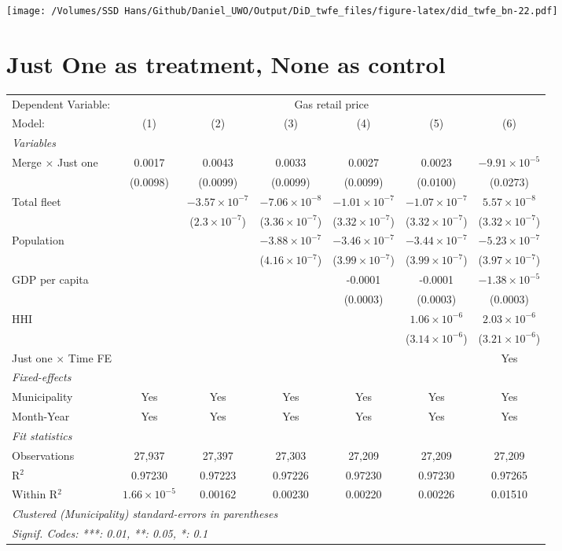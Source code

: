 \documentclass[
]{article}
\begin{document}
\texttt{[image: /Volumes/SSD Hans/Github/Daniel\_UWO/Output/DiD\_twfe\_files/figure-latex/did\_twfe\_bn-22.pdf]}

\hypertarget{just-one-as-treatment-none-as-control}{%
\section{Just One as treatment, None as
control}\label{just-one-as-treatment-none-as-control}}

\begin{tabular}{lcccccc}
\tabularnewline\midrule\midrule
Dependent Variable:&\multicolumn{6}{c}{Gas retail price}\\
Model:&(1) & (2) & (3) & (4) & (5) & (6)\\
\midrule \emph{Variables}&   &   &   &   &   &  \\
Merge $\times $ Just one & 0.0017 & 0.0043 & 0.0033 & 0.0027 & 0.0023 & $-9.91\times 10^{-5}$\\
  &(0.0098) & (0.0099) & (0.0099) & (0.0099) & (0.0100) & (0.0273)\\
Total fleet &    & $-3.57\times 10^{-7}$ & $-7.06\times 10^{-8}$ & $-1.01\times 10^{-7}$ & $-1.07\times 10^{-7}$ & $5.57\times 10^{-8}$\\
  &   & ($2.3\times 10^{-7}$) & ($3.36\times 10^{-7}$) & ($3.32\times 10^{-7}$) & ($3.32\times 10^{-7}$) & ($3.32\times 10^{-7}$)\\
Population &    &    & $-3.88\times 10^{-7}$ & $-3.46\times 10^{-7}$ & $-3.44\times 10^{-7}$ & $-5.23\times 10^{-7}$\\
  &   &    & ($4.16\times 10^{-7}$) & ($3.99\times 10^{-7}$) & ($3.99\times 10^{-7}$) & ($3.97\times 10^{-7}$)\\
GDP per capita &    &    &    & -0.0001 & -0.0001 & $-1.38\times 10^{-5}$\\
  &   &    &    & (0.0003) & (0.0003) & (0.0003)\\
HHI &    &    &    &    & $1.06\times 10^{-6}$ & $2.03\times 10^{-6}$\\
  &   &    &    &    & ($3.14\times 10^{-6}$) & ($3.21\times 10^{-6}$)\\
Just one $\times$ Time FE &  &  &  &  &  & Yes\\
\midrule \emph{Fixed-effects}&   &   &   &   &   &  \\
Municipality & Yes & Yes & Yes & Yes & Yes & Yes\\
Month-Year & Yes & Yes & Yes & Yes & Yes & Yes\\
\midrule \emph{Fit statistics}&  & & & & & \\
Observations & 27,937&27,397&27,303&27,209&27,209&27,209\\
R$^2$ & 0.97230&0.97223&0.97226&0.97230&0.97230&0.97265\\
Within R$^2$ & $1.66\times 10^{-5}$&0.00162&0.00230&0.00220&0.00226&0.01510\\
\midrule\midrule\multicolumn{7}{l}{\emph{Clustered (Municipality) standard-errors in parentheses}}\\
\multicolumn{7}{l}{\emph{Signif. Codes: ***: 0.01, **: 0.05, *: 0.1}}\\
\end{tabular}
\end{document}

